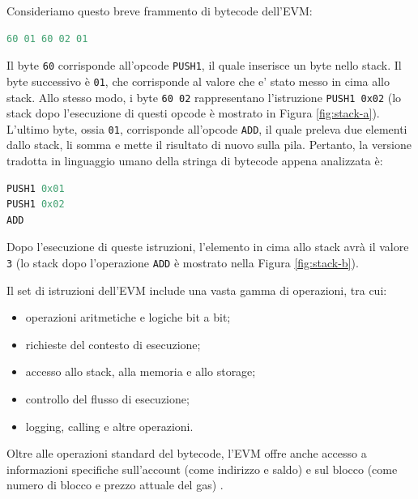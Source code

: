Consideriamo questo breve frammento di bytecode dell’EVM:
\begin{algorithm}[ht]
\caption{Frammento di bytecode dell’EVM.}
\label{lst:frammentoBytecode}
\begin{lstlisting}[style=customsolidity, language=C, numbers=none]
60 01 60 02 01
\end{lstlisting}
\end{algorithm}

Il byte {\tt60} corrisponde all’opcode {\tt PUSH1}, il quale inserisce un byte nello stack. Il byte successivo è {\tt 01}, che corrisponde al valore che e’ stato 
messo in cima allo stack. Allo stesso modo, i byte {\tt 60 02} rappresentano l’istruzione {\tt PUSH1 0x02} (lo stack dopo l’esecuzione di questi opcode è mostrato 
in Figura \ref{fig:stack-a}). L’ultimo byte, ossia {\tt 01}, corrisponde all’opcode {\tt ADD}, il quale preleva due elementi dallo stack, li somma e mette il risultato di nuovo 
sulla pila. Pertanto, la versione tradotta in linguaggio umano della stringa di bytecode appena analizzata è:

\begin{algorithm}[ht]
\caption{Traduzione in linguaggio umano dell'Algoritmo \ref*{lst:frammentoBytecode}.}
\label{lst:frammentoBytecodeUmano}
\begin{lstlisting}[style=customsolidity, language=C, numbers=none]
PUSH1 0x01
PUSH1 0x02
ADD
\end{lstlisting}
\end{algorithm}

Dopo l’esecuzione di queste istruzioni, l’elemento in cima allo stack avrà il valore {\tt 3} (lo stack dopo l’operazione {\tt ADD} è mostrato nella Figura \ref{fig:stack-b}).

Il set di istruzioni dell’EVM include una vasta gamma di operazioni, tra cui:

\begin{itemize}
    \item operazioni aritmetiche e logiche bit a bit;
    \item richieste del contesto di esecuzione;
    \item accesso allo stack, alla memoria e allo storage;
    \item controllo del flusso di esecuzione;
    \item logging, calling e altre operazioni.
\end{itemize}

Oltre alle operazioni standard del bytecode, l’EVM offre anche accesso a informazioni specifiche sull’account (come indirizzo e saldo) e sul blocco (come numero di 
blocco e prezzo attuale del gas) \cite{antonopoulos2018mastering}.

